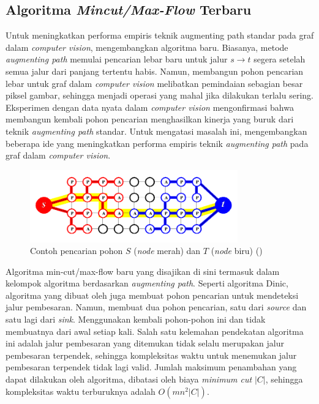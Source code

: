 \subsection{{Algoritma \emph{Mincut/Max-Flow} Terbaru}}


Untuk meningkatkan performa empiris teknik augmenting path standar pada graf 
dalam \emph{computer vision}, \cite{Boykov:2004} mengembangkan algoritma baru. Biasanya, 
metode \emph{augmenting path} memulai pencarian lebar baru untuk jalur \(s \rightarrow t\) 
segera setelah semua jalur dari panjang tertentu habis. Namun, membangun pohon 
pencarian lebar untuk graf dalam \emph{computer vision} melibatkan pemindaian sebagian 
besar piksel gambar, sehingga menjadi operasi yang mahal jika dilakukan terlalu 
sering. Eksperimen dengan data nyata dalam \emph{computer vision} mengonfirmasi bahwa 
membangun kembali pohon pencarian menghasilkan kinerja yang buruk dari teknik 
\emph{augmenting path} standar. Untuk mengatasi masalah ini, \cite{Boykov:2004} 
mengembangkan beberapa ide yang meningkatkan performa empiris teknik \emph{augmenting path} 
pada graf dalam \emph{computer vision}.


\begin{figure}[H]
  \centering
  \includegraphics[width=0.8\textwidth]{gambar/gambar-3.png}
  \caption{
    Contoh pencarian pohon \(S\) (\emph{node} merah) dan \(T\) (\emph{node} biru) (\cite{Boykov:2004})
    }
  \label{img:contoh_pencarian_pohon}
\end{figure}

Algoritma min-cut/max-flow baru yang disajikan di sini termasuk dalam kelompok 
algoritma berdasarkan \emph{augmenting path}. Seperti algoritma Dinic, algoritma 
yang dibuat oleh \cite{Boykov:2004} juga membuat pohon pencarian untuk mendeteksi 
jalur pembesaran. Namun, membuat dua pohon pencarian, satu dari \emph{source} dan satu 
lagi dari \emph{sink}. Menggunakan kembali pohon-pohon ini dan tidak membuatnya 
dari awal setiap kali. Salah satu kelemahan pendekatan algoritma ini adalah jalur 
pembesaran yang ditemukan tidak selalu merupakan jalur pembesaran terpendek, sehingga 
kompleksitas waktu untuk menemukan jalur pembesaran terpendek tidak lagi valid. 
Jumlah maksimum penambahan yang dapat dilakukan oleh algoritma, dibatasi oleh 
biaya \emph{minimum cut} \(|C|\), sehingga kompleksitas waktu terburuknya adalah
\(O(mn^2 |C|)\).

